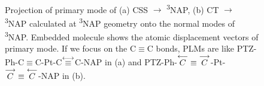 \begin{figure}[!t]
\\
\caption{
Projection of primary mode of (a) CSS $\rightarrow$ \textsuperscript{3}NAP, (b) CT $\rightarrow$ \textsuperscript{3}NAP calculated at \textsuperscript{3}NAP geometry onto the normal modes of \textsuperscript{3}NAP. Embedded molecule shows the atomic displacement vectors of primary mode. If we focus on the C$\equiv$C bonds, PLMs are like
PTZ-Ph-C$\equiv$C-Pt-C$\protect\overset{\longleftrightarrow}{\equiv}$C-NAP
in (a) and
PTZ-Ph-$\protect\overset{\longleftarrow}{C}\equiv\protect\overset{\longrightarrow}{C}$-Pt-$\protect\overset{\longrightarrow}{C}\equiv\protect\overset{\longleftarrow}{C}$-NAP
in (b).}\label{projT1}
\end{figure}

